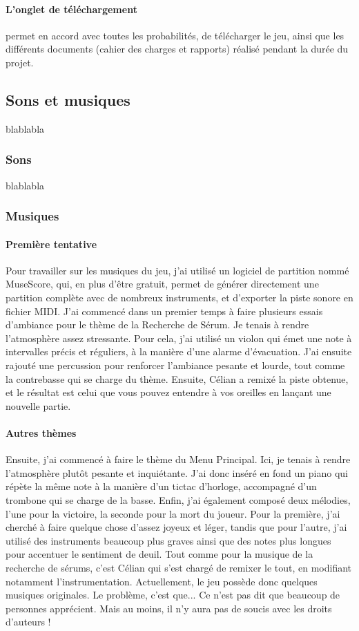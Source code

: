 \documentclass{article}
\begin{document}
\paragraph{L'onglet de téléchargement}permet en accord avec toutes les probabilités, de télécharger le jeu, ainsi que les différents documents (cahier des charges et rapports) réalisé pendant la durée du projet.

\subsection{Sons et musiques}
blablabla
\subsubsection{Sons}
blablabla
\subsubsection{Musiques}
\paragraph{Première tentative}
Pour travailler sur les musiques du jeu, j'ai utilisé un logiciel de partition nommé MuseScore, qui, en plus d'être gratuit, permet de générer directement une partition complète avec de nombreux instruments, et d'exporter la piste sonore en fichier MIDI. J'ai commencé dans un premier temps à faire plusieurs essais d'ambiance pour le thème de la Recherche de Sérum. Je tenais à rendre l'atmosphère assez stressante. Pour cela, j'ai utilisé un violon qui émet une note à intervalles précis et réguliers, à la manière d'une alarme d'évacuation. J'ai ensuite rajouté une percussion pour renforcer l'ambiance pesante et lourde, tout comme la contrebasse qui se charge du thème. Ensuite, Célian a remixé la piste obtenue, et le résultat est celui que vous pouvez entendre à vos oreilles en lançant une nouvelle partie.

\paragraph{Autres thèmes}
Ensuite, j'ai commencé à faire le thème du Menu Principal. Ici, je tenais à rendre l'atmosphère plutôt pesante et inquiétante. J'ai donc inséré en fond un piano qui répète la même note à la manière d'un tictac d'horloge, accompagné d'un trombone qui se charge de la basse. Enfin, j'ai également composé deux mélodies, l'une pour la victoire, la seconde pour la mort du joueur. Pour la première, j'ai cherché à faire quelque chose d'assez joyeux et léger, tandis que pour l'autre, j'ai utilisé des instruments beaucoup plus graves ainsi que des notes plus longues pour accentuer le sentiment de deuil. Tout comme pour la musique de la recherche de sérums, c'est Célian qui s'est chargé de remixer le tout, en modifiant notamment l'instrumentation. Actuellement, le jeu possède donc quelques musiques originales. Le problème, c'est que... Ce n'est pas dit que beaucoup de personnes apprécient. Mais au moins, il n'y aura pas de soucis avec les droits d'auteurs !
\end{document}
